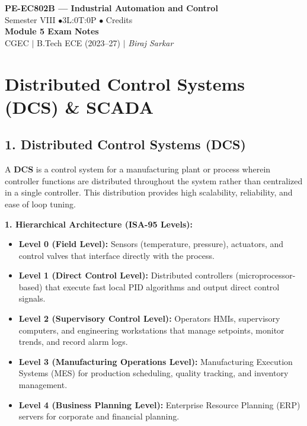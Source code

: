 \documentclass[12pt,a4paper]{article}
\begin{document}

\begin{center}
  {\LARGE\bfseries\color{myred} PE-EC802B --- Industrial Automation and Control}\\[5pt]
  {\normalsize\color{mydark} Semester VIII \quad$\bullet$\quad 3L:0T:0P \quad$\bullet$ Credits}\\[3pt]
  {\normalsize\color{myteal}\textbf{Module 5 Exam Notes}}\\[3pt]
  {\small\color{mydark} CGEC \;$|$\; B.Tech ECE (2023--27) \;$|$\; \textit{Biraj Sarkar}}
\end{center}
\vspace{2pt}
\noindent{\color{myred}\rule{\linewidth}{1.5pt}}
\vspace{2pt}

\hypersetup{linkcolor=mydark}
\tableofcontents
\hypersetup{linkcolor=myteal}
\newpage

\section{Distributed Control Systems (DCS) \& SCADA}

\subsection{1. Distributed Control Systems (DCS)}
A \textbf{DCS} is a control system for a manufacturing plant or process wherein controller functions are distributed throughout the system rather than centralized in a single controller. This distribution provides high scalability, reliability, and ease of loop tuning.

\textbf{1. Hierarchical Architecture (ISA-95 Levels):}
\begin{itemize}[leftmargin=*, itemsep=2.5pt]
  \item \textbf{Level 0 (Field Level):} Sensors (temperature, pressure), actuators, and control valves that interface directly with the process.
  \item \textbf{Level 1 (Direct Control Level):} Distributed controllers (microprocessor-based) that execute fast local PID algorithms and output direct control signals.
  \item \textbf{Level 2 (Supervisory Control Level):} Operators HMIs, supervisory computers, and engineering workstations that manage setpoints, monitor trends, and record alarm logs.
  \item \textbf{Level 3 (Manufacturing Operations Level):} Manufacturing Execution Systems (MES) for production scheduling, quality tracking, and inventory management.
  \item \textbf{Level 4 (Business Planning Level):} Enterprise Resource Planning (ERP) servers for corporate and financial planning.
\end{itemize}
\end{document}
